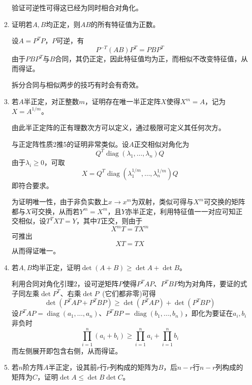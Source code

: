 \documentclass[a4paper,UTF8,fontset=windows]{ctexart}
\DeclareMathOperator{\diag}{diag}
\newcommand*{\note}{\noindent *}
\begin{document}
\begin{enumerate}
    验证可逆性可得这已经为同时相合对角化。
    
    \item 证明若$A,B$均正定，则$AB$的所有特征值为正数。
    
    设$A=P^TP$，$P$可逆，有
    $$P^{-T}(AB)P^T=PBP^T$$
    由于$PBP^T$与$B$合同，其仍正定，因此特征值均为正，而相似不改变特征值，从而得证。

    \note 拆分合同与相似两步的技巧有时会有奇效。
    
    \item 若$A$半正定，对正整数$m$，证明存在唯一半正定阵$X$使得$X^m=A$，记为$X=A^{1/m}$。
    
    \note 由此半正定阵的正有理数次方可以定义，通过极限可定义其任何次方。

    与正定阵性质2推5的证明非常类似。设$A$正交相似对角化为
    $$Q^T\diag(\lambda_1,\dots,\lambda_n)Q$$
    由于$\lambda_i\ge0$，可取
    $$X=Q^T\diag(\lambda_1^{1/m},\dots,\lambda_n^{1/m})Q$$
    即符合要求。

    为证明唯一性，由于非负实数上$x\to x^m$为双射，类似可得与$X^m$可交换的矩阵都与$X$可交换，从而若$Y^m=X^m$，且$Y$亦半正定，利用特征值一一对应可知正交相似，设$T^TXT=Y$，其中$T$正交，则由于
    $$X^mT=TX^m$$
    可推出
    $$XT=TX$$
    从而得证唯一。

    \item 若$A,B$均半正定，证明$\det(A+B)\ge\det A+\det B$。
    
    利用合同对角化引理2，设可逆矩阵$P$使得$P^TAP$、$P^TBP$均为对角阵，要证的式子同左乘$\det P^T$、右乘$\det P$\ (它们都非零)可得
    $$\det(P^TAP+P^TBP)\ge\det(P^TAP)+\det(P^TBP)$$
    设$P^TAP=\diag(a_1,\dots,a_n)$、$P^TBP=\diag(b_1,\dots,b_n)$，即化为要证在$a_i,b_i$非负时
    $$\prod_{i=1}^n(a_i+b_i)\ge\prod_{i=1}^na_i+\prod_{i=1}^nb_i$$
    而左侧展开即包含右侧，从而得证。
    
    \item 若$n$阶方阵$A$半正定，设其前$r$行$r$列构成的矩阵为$B$，后$n-r$行$n-r$列构成的矩阵为$C$，证明$\det A\le\det B\det C$。
    

\end{enumerate}
\end{document}
